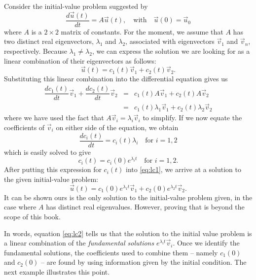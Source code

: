 \documentclass[../book.tex]{subfiles}
\begin{document}
Consider the initial-value problem suggested by
\begin{equation}\label{eq:sys-9}
\frac{d\vec{u}(t)}{dt} = A \vec{u}(t), \quad 
\text{with}\quad \vec{u}(0) = \vec{u}_0 
\end{equation}
where \(A\) is a \(2\times 2\) matrix of constants. For the moment, we assume that \(A\) has two distinct real eigenvectors, \(\lambda_1\) and \(\lambda_2\), associated with eigenvectors \(\vec{v}_1\) and \(\vec{v}_n\), respectively. Because \(\lambda_1 \neq \lambda_2\), we can express the solution we are looking for as a linear combination of their eigenvectors as follows:
\begin{equation}\label{eq:lc1}
  \vec{u}(t)
  =
  c_1(t) \vec{v}_1 
  +
  c_2(t) \vec{v}_2.
\end{equation}
Substituting this linear combination into the differential equation gives us
\begin{equation}\label{eq:sys-10}
\begin{array}{lcl}
  \dfrac{d c_1(t)}{dt}  \vec{v}_1
  +
  \dfrac{d c_2(t)}{dt}  \vec{v}_2
      &=& 
      c_1(t) A \vec{v}_1 
      +
      c_2(t) A \vec{v}_2
      \\[1ex]
      &=&
      c_1(t) \lambda_1 \vec{v}_1 
      +
      c_2(t) \lambda_2 \vec{v}_2
\end{array}
\end{equation}
where we have used the fact that \(A \vec{v}_i = \lambda_i  \vec{v}_i\) to simplify. If we now equate the coefficients of \(\vec{v}_i\) on either side of the equation, we obtain
\begin{equation}\label{eq:sys-11}
\frac{dc_i(t)}{dt} = c_i(t) \lambda_i  
\quad
\text{for } i = 1, 2
\end{equation}
which is easily solved to give
\begin{equation}\label{eq:sys-12}
c_i(t) = c_i(0) e^{\lambda_i  t}
\quad
\text{for } i = 1,2.
\end{equation}
After putting this expression for \(c_i(t)\) into \eqref{eq:lc1}, we arrive at a solution to the given initial-value problem:
\begin{equation} \label{eq:lc2}
  \vec{u}(t) = c_1(0) e^{\lambda_1  t}  \vec{v}_1
  +
  c_2(0) e^{\lambda_2  t} \vec{v}_2.
\end{equation}
It can be shown ours is the only solution to the initial-value problem given, in the case where \(A\) has distinct real eigenvalues. However, proving that is beyond the scope of this book.

In words, equation \eqref{eq:lc2} tells us that the solution to the initial value problem is a linear combination of the \emph{fundamental solutions}  \(e^{\lambda_i  t} \vec{v}_i\). Once we identify the fundamental solutions, the coefficients used to combine them -- namely \(c_1(0)\) and \(c_2(0)\) -- are found by using information given by the initial condition. The next example illustrates this point.
\end{document}
